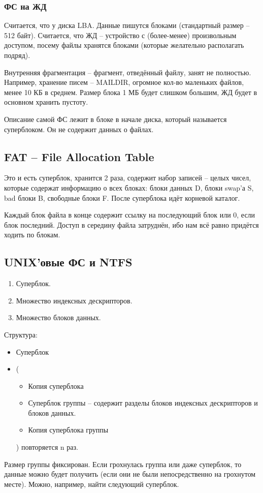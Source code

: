 \documentclass[a4paper,10pt]{article}
\begin{document}
\subsubsection{ФС на ЖД}
Считается, что у диска LBA. Данные пишутся блоками (стандартный размер -- 512 байт). Считается, что ЖД -- устройство с (более-менее) произвольным доступом, посему файлы хранятся блоками (которые желательно располагать подряд).

Внутренняя фрагментация -- фрагмент, отведённый файлу, занят не полностью. 
Например, хранение писем -- MAILDIR, огромное кол-во маленьких файлов, менее 10 КБ в среднем. Размер блока 1 МБ будет слишком большим, ЖД будет в основном хранить пустоту.

Описание самой ФС лежит в блоке в начале диска, который называется суперблоком. Он не содержит данных о файлах.

\subsection{FAT -- File Allocation Table}
Это и есть суперблок, хранится 2 раза, содержит набор записей -- целых чисел, которые содержат информацию о всех блоках: блоки данных D, блоки swap'а S, bad блоки B, свободные блоки F.
После суперблока идёт корневой каталог.

Каждый блок файла в конце содержит ссылку на последующий блок или 0, если блок последний. Доступ в середину файла затруднён, ибо нам всё равно придётся ходить по блокам.

\subsection{UNIX'овые ФС и NTFS}
\begin{enumerate}
 \item Суперблок.
 \item Множество индексных дескрипторов.
 \item Множество блоков данных.
\end{enumerate}
Структура:
\begin{itemize}
 \item Суперблок
 \item (
 \begin{itemize}
  \item Копия суперблока
  \item Суперблок группы -- содержит разделы блоков индексных дескрипторов и блоков данных.
  \item Копия суперблока группы
 \end{itemize}
) повторяется n раз.
\end{itemize}
Размер группы фиксирован. Если грохнулась группа или даже суперблок, то данные можно будет получить (если они не были непосредственно на грохнутом месте). Можно, например, найти следующий суперблок.
\end{document}

